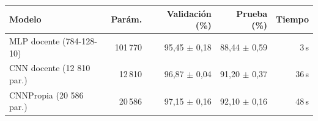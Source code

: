 \begin{tabular}{lrrrr}
\toprule
Modelo & Parám. & Validación (\%) & Prueba (\%) & Tiempo \\
\midrule
MLP docente (784-128-10) & 101\,770 & 95,45 $\pm$ 0,18 & 88,44 $\pm$ 0,59 & 3\,s \\
CNN docente (12 810 par.) & 12\,810 & 96,87 $\pm$ 0,04 & 91,20 $\pm$ 0,37 & 36\,s \\
CNNPropia (20 586 par.) & 20\,586 & 97,15 $\pm$ 0,16 & 92,10 $\pm$ 0,16 & 48\,s \\
\bottomrule
\end{tabular}
